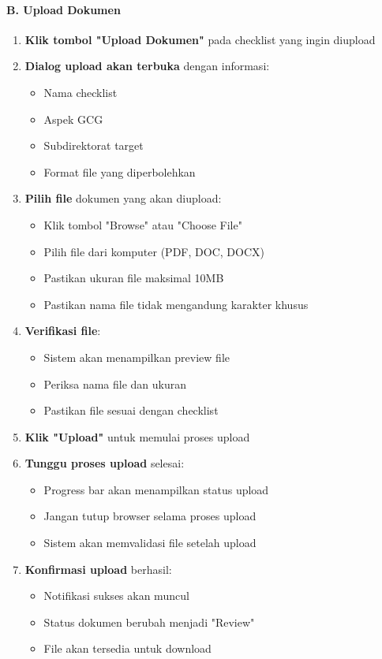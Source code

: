 \documentclass[12pt,a4paper]{article}
\begin{document}
\paragraph{B. Upload Dokumen}
\begin{enumerate}
\item \textbf{Klik tombol "Upload Dokumen"} pada checklist yang ingin diupload
\item \textbf{Dialog upload akan terbuka} dengan informasi:
\begin{itemize}
\item Nama checklist
\item Aspek GCG
\item Subdirektorat target
\item Format file yang diperbolehkan
\end{itemize}
\item \textbf{Pilih file} dokumen yang akan diupload:
\begin{itemize}
\item Klik tombol "Browse" atau "Choose File"
\item Pilih file dari komputer (PDF, DOC, DOCX)
\item Pastikan ukuran file maksimal 10MB
\item Pastikan nama file tidak mengandung karakter khusus
\end{itemize}
\item \textbf{Verifikasi file}:
\begin{itemize}
\item Sistem akan menampilkan preview file
\item Periksa nama file dan ukuran
\item Pastikan file sesuai dengan checklist
\end{itemize}
\item \textbf{Klik "Upload"} untuk memulai proses upload
\item \textbf{Tunggu proses upload} selesai:
\begin{itemize}
\item Progress bar akan menampilkan status upload
\item Jangan tutup browser selama proses upload
\item Sistem akan memvalidasi file setelah upload
\end{itemize}
\item \textbf{Konfirmasi upload} berhasil:
\begin{itemize}
\item Notifikasi sukses akan muncul
\item Status dokumen berubah menjadi "Review"
\item File akan tersedia untuk download
\end{itemize}
\end{enumerate}
\end{document}

